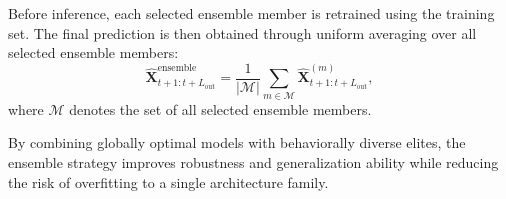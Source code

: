 Before inference, each selected ensemble member is retrained using the training set. The final prediction is then obtained through uniform averaging over all selected ensemble members:
\begin{equation}
\hat{\mathbf{X}}_{t+1:t+L_{\text{out}}}^{\text{ensemble}} =
\frac{1}{|\mathcal{M}|} \sum_{m \in \mathcal{M}} \hat{\mathbf{X}}_{t+1:t+L_{\text{out}}}^{(m)},
\end{equation}
where $\mathcal{M}$ denotes the set of all selected ensemble members.

By combining globally optimal models with behaviorally diverse elites, the ensemble strategy improves robustness and generalization ability while reducing the risk of overfitting to a single architecture family.
